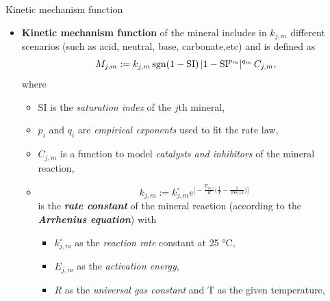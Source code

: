 %
\begin{frame}{Kinetic mechanism function}
	\begin{itemize}
		\item \alert{\bf Kinetic mechanism function} of the mineral includes in $k_{j,m}$ different scenarios (such as acid, neutral, base, carbonate,etc) and is defined as
		\[
		M_{j,m}:= k_{j,m} \, {\rm sgn}(1-\mathrm{SI})\, 
		|1-\mathrm{SI}^{p_{m}}|^{q_m}\,C_{j, m},
		\]
		where
		\begin{itemize}
			\item $\mathrm{SI}$ is the \emph{saturation index} of the $j$th mineral, 
			\item $p_{i}$ and $q_{i}$ are \emph{empirical exponents} used to fit the rate law,
			\item $C_{j,m}$ is a function to model \emph{catalysts and inhibitors} of the mineral reaction, 
			\item 
			\[
			k_{j,m}:=k_{j,m}^{\circ} e^{\Big[-\tfrac{E_{m,i}}{R}\Big(\tfrac{1}{T}-\tfrac{1}{298.15}\Big)\Big]} \]
			is the \emph{\bf rate constant} of the mineral reaction (according to the \emph{\bf Arrhenius equation}) with
			\begin{itemize}
				\item $k_{j,m}^{\circ}$ as the \emph{reaction rate} constant at 25 °C, 
				\item $E_{j,m}$ as the \emph{activation energy}, 
				\item $R$ as the \emph{universal gas constant} and T as the given temperature, 
			\end{itemize}
		\end{itemize}
	\end{itemize}
\end{frame}
%
%
